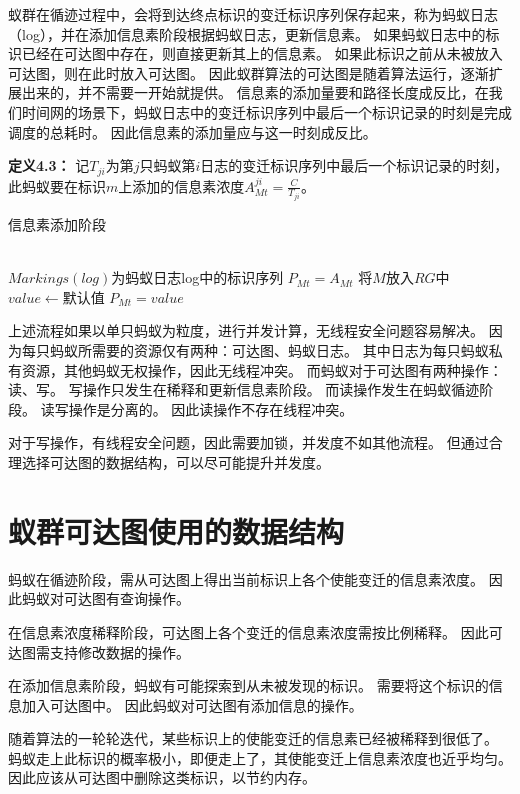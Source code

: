 蚁群在循迹过程中，会将到达终点标识的变迁标识序列保存起来，称为蚂蚁日志（log），并在添加信息素阶段根据蚂蚁日志，更新信息素。
如果蚂蚁日志中的标识已经在可达图中存在，则直接更新其上的信息素。
如果此标识之前从未被放入可达图，则在此时放入可达图。
因此蚁群算法的可达图是随着算法运行，逐渐扩展出来的，并不需要一开始就提供。
信息素的添加量要和路径长度成反比，在我们时间网的场景下，蚂蚁日志中的变迁标识序列中最后一个标识记录的时刻是完成调度的总耗时。
因此信息素的添加量应与这一时刻成反比。

\textbf{定义4.3}\textbf{：}
记$T_{ji}$为第$j$只蚂蚁第$i$日志的变迁标识序列中最后一个标识记录的时刻，此蚂蚁要在标识$m$上添加的信息素浓度$A_{Mt}^{ji}=\frac{C}{T_{ji}} $。

\begin{algorithm}[H]
	\caption{信息素添加阶段}
	\label{alg4-7}
	\begin{algorithmic}
				 \\$Markings(log)$为蚂蚁日志log中的标识序列
						\State $P_{Mt}=A_{Mt}$
					\Else
						\State 将$M$放入$RG$中
						\State $value \leftarrow 默认值$
						\State $P_{Mt}=value$
					\EndIf
				\EndFor
			\EndFor
		\EndProcedure
	\end{algorithmic}
\end{algorithm}
上述流程如果以单只蚂蚁为粒度，进行并发计算，无线程安全问题容易解决。
因为每只蚂蚁所需要的资源仅有两种：可达图、蚂蚁日志。
其中日志为每只蚂蚁私有资源，其他蚂蚁无权操作，因此无线程冲突。
而蚂蚁对于可达图有两种操作：读、写。
写操作只发生在稀释和更新信息素阶段。
而读操作发生在蚂蚁循迹阶段。
读写操作是分离的。
因此读操作不存在线程冲突。

对于写操作，有线程安全问题，因此需要加锁，并发度不如其他流程。
但通过合理选择可达图的数据结构，可以尽可能提升并发度。

\section{蚁群可达图使用的数据结构}
蚂蚁在循迹阶段，需从可达图上得出当前标识上各个使能变迁的信息素浓度。
因此蚂蚁对可达图有查询操作。

在信息素浓度稀释阶段，可达图上各个变迁的信息素浓度需按比例稀释。
因此可达图需支持修改数据的操作。

在添加信息素阶段，蚂蚁有可能探索到从未被发现的标识。
需要将这个标识的信息加入可达图中。
因此蚂蚁对可达图有添加信息的操作。

随着算法的一轮轮迭代，某些标识上的使能变迁的信息素已经被稀释到很低了。
蚂蚁走上此标识的概率极小，即便走上了，其使能变迁上信息素浓度也近乎均匀。
因此应该从可达图中删除这类标识，以节约内存。

